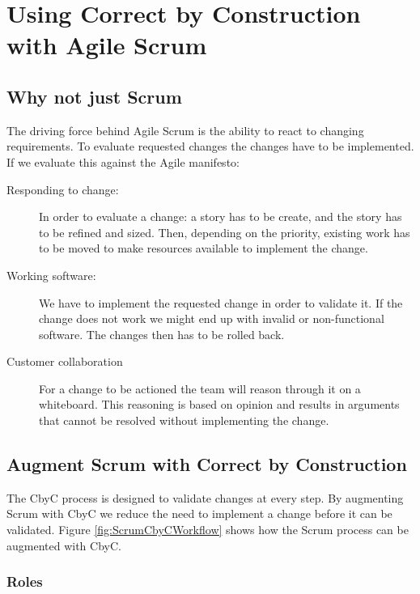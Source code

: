 
\chapter{Using Correct by Construction with Agile Scrum} %

\label{CbyCWithAgileScrum} %

\section{Why not just Scrum}

The driving force behind Agile Scrum is the ability to react to changing requirements.
To evaluate requested changes the changes have to be implemented. 
If we evaluate this against the Agile manifesto:
\begin{description}
	\item [Responding to change:]  In order to evaluate a change: a story has to be
		create, and the story has to be refined and sized. Then, depending on the 
		priority, existing work has to be moved to make resources available to implement
		the change. 
	\item [Working software:] We have to implement the requested change in order to
		validate it. If the change does not work we might end up with invalid or
		non-functional software. The changes then has to be rolled back.
	\item [Customer collaboration] For a change to be actioned the team will reason
		through it on a whiteboard. This reasoning is based on opinion and results in
		arguments that cannot be resolved without implementing the change.
\end{description}

\section{Augment Scrum with Correct by Construction}

The CbyC process is designed to validate changes at every step. By augmenting
Scrum with CbyC we reduce the need to implement a change before it can be validated.
Figure \ref{fig:ScrumCbyCWorkflow} shows how the Scrum process can be augmented
with CbyC.

\subsection{Roles}

